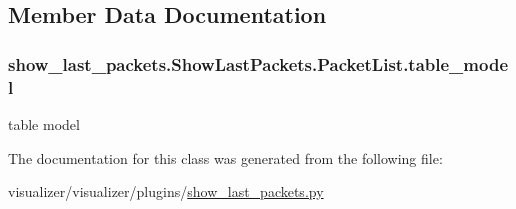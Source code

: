 \subsection{Member Data Documentation}
\subsubsection[{\texorpdfstring{table\+\_\+model}{table_model}}]{\setlength{\rightskip}{0pt plus 5cm}show\+\_\+last\+\_\+packets.\+Show\+Last\+Packets.\+Packet\+List.\+table\+\_\+model}\hypertarget{classshow__last__packets_1_1ShowLastPackets_1_1PacketList_af32a6f7770460214514bb2e4279ec267}{}\label{classshow__last__packets_1_1ShowLastPackets_1_1PacketList_af32a6f7770460214514bb2e4279ec267}


table model 



The documentation for this class was generated from the following file\+:\begin{DoxyCompactItemize}
\item 
visualizer/visualizer/plugins/\hyperlink{show__last__packets_8py}{show\+\_\+last\+\_\+packets.\+py}\end{DoxyCompactItemize}
